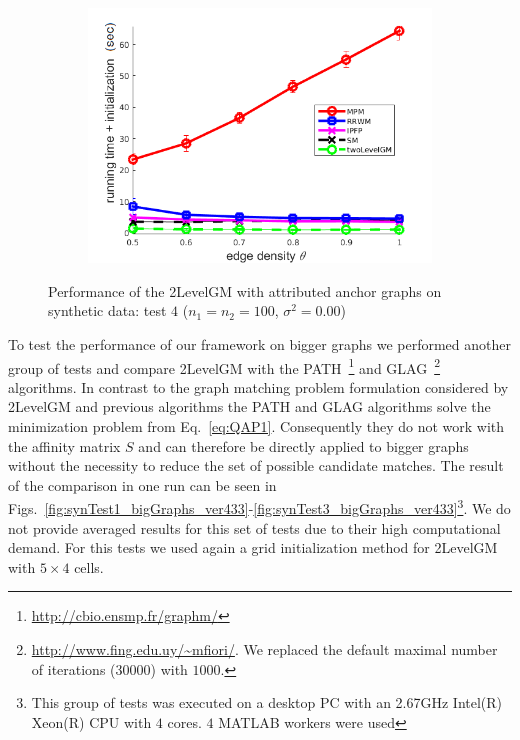 \begin{figure}[h]
\begin{subfigure}[b]{0.33\textwidth}
			\includegraphics[scale=0.33]{"chapter3/fig/SyntheticTest/descr/Results_v4.3.3/Test4/time_summary_avg10t"} 
		\end{subfigure} 	
	\caption[Performance of the 2LevelGM with attributed anchor graphs on synthetic data (test $4$)]{Performance of the 2LevelGM with attributed anchor graphs on synthetic data: test $4$ ($n_1=n_2=100$, $\sigma^2=0.00$)}
	\label{fig:synTest4_descr_ver433}
\end{figure}

To test the performance of our framework on bigger graphs we performed another group of tests and compare 2LevelGM with the PATH~\cite{Zazlavskiy2008_PATH}\footnote{\url{http://cbio.ensmp.fr/graphm/}} and GLAG~\cite{Fiori2013_GLAG}\footnote{\url{http://www.fing.edu.uy/~mfiori/}. We replaced the default maximal number of iterations ($30000$) with $1000$.} algorithms. In contrast to the graph matching problem formulation considered by 2LevelGM and previous algorithms the PATH and GLAG algorithms solve the minimization problem from Eq.~\eqref{eq:QAP1}. Consequently they do not work with the affinity matrix $S$ and can therefore be directly applied to bigger graphs without the necessity to reduce the set of possible candidate matches. The result of the comparison in one run can be seen in Figs.~\ref{fig:synTest1_bigGraphs_ver433}-\ref{fig:synTest3_bigGraphs_ver433}\footnote{This group of tests was executed on a desktop PC with an 2.67GHz Intel(R) Xeon(R) CPU with $4$ cores. $4$ MATLAB workers were used}. We do not provide averaged results for this set of tests due to their high computational demand. For this tests we used again a grid initialization method for 2LevelGM with $5\times 4$ cells.
\FloatBarrier

